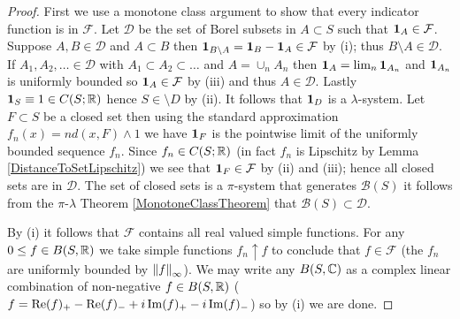\begin{proof}
First we use a monotone class argument to show that every indicator function is in $\mathcal{F}$.  Let $\mathcal{D}$ be the set of Borel subsets in $A \subset S$ such that $\textbf{1}_{A} \in \mathcal{F}$.  Suppose $A, B \in \mathcal{D}$ and $A \subset B$ then $\textbf{1}_{B \setminus A} = \textbf{1}_{B} - \textbf{1}_{A} \in \mathcal{F}$ by (i); thus $B \setminus A \in \mathcal{D}$.  If $A_1, A_2, \dotsc \in \mathcal{D}$ with $A_1 \subset A_2 \subset \dotsc$ and $A = \cup_n A_n$ then $\textbf{1}_{A} = \lim_n \textbf{1}_{A_n}$ and $\textbf{1}_{A_n}$ is uniformly bounded so $\textbf{1}_{A} \in \mathcal{F}$ by (iii) and thus $A \in \mathcal{D}$.  Lastly $\textbf{1}_{S} \equiv 1 \in C(S; \mathbb{R})$ hence $S \in \setminus{D}$ by (ii).  It follows that $\textbf{1}_{D}$ is a $\lambda$-system.  Let $F \subset S$ be a closed set then using the standard approximation $f_n(x)  =  nd(x,F)  \wedge 1$ we have $\textbf{1}_{F}$ is the pointwise limit of the uniformly bounded sequence $f_n$.  Since $f_n \in C(S; \mathbb{R})$ (in fact $f_n$ is Lipschitz by Lemma \ref{DistanceToSetLipschitz}) we see that $\textbf{1}_{F} \in \mathcal{F}$ by (ii) and (iii); hence all closed sets are in $\mathcal{D}$.  The set of closed sets is a $\pi$-system that generates $\mathcal{B}(S)$ it follows from the $\pi$-$\lambda$ Theorem \ref{MonotoneClassTheorem} that $\mathcal{B}(S) \subset \mathcal{D}$.  

By (i) it follows that $\mathcal{F}$ contains all real valued simple
functions.  For any $0 \leq f \in B(S, \mathbb{R})$ we
take simple functions $f_n \uparrow f$ to conclude that $f \in
\mathcal{F}$ (the $f_n$ are uniformly bounded by $\left \lVert f \right \rVert_\infty$).
We may write any $B(S, \mathbb{C})$ as a complex
linear combination of non-negative $f \in
B(S, \mathbb{R})$ ($f = \operatorname*{Re}(f)_+ - \operatorname*{Re}(f)_- + i \operatorname*{Im}(f)_+ - i \operatorname*{Im}(f)_-$) so by (i) we are done.
\end{proof}

